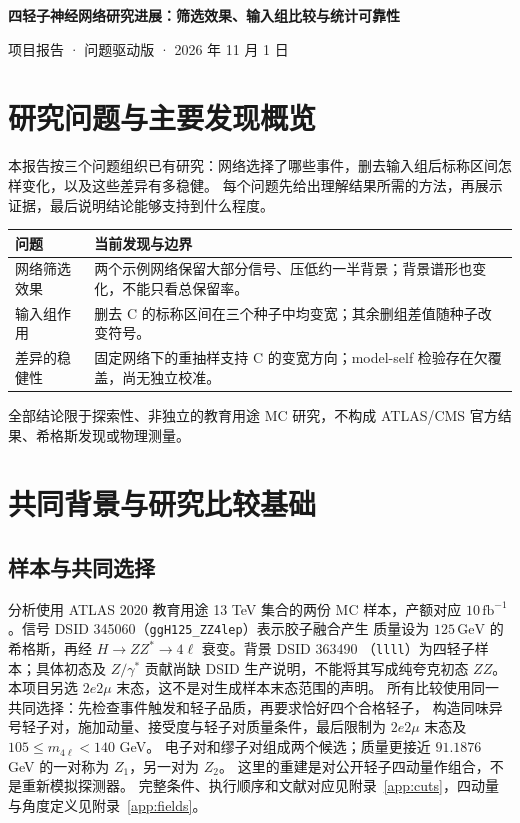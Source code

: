 \documentclass[11pt,a4paper,fontset=fandol,scheme=plain]{ctexart}
\newcommand{\gev}{\,\mathrm{GeV}}
\begin{document}
{\LARGE\bfseries\color{reportblue} 四轻子神经网络研究进展：筛选效果、输入组比较与统计可靠性\par}
\vspace{6pt}
项目报告 · 问题驱动版 · 2026 年 11 月 1 日

\section{研究问题与主要发现概览}

本报告按三个问题组织已有研究：网络选择了哪些事件，删去输入组后标称区间怎样变化，以及这些差异有多稳健。
每个问题先给出理解结果所需的方法，再展示证据，最后说明结论能够支持到什么程度。

\begin{center}
\small
\begin{tabularx}{\linewidth}{@{}p{.23\linewidth}Y@{}}
\toprule
问题 & 当前发现与边界 \\
\midrule
网络筛选效果 & 两个示例网络保留大部分信号、压低约一半背景；背景谱形也变化，不能只看总保留率。 \\
输入组作用 & 删去 C 的标称区间在三个种子中均变宽；其余删组差值随种子改变符号。 \\
差异的稳健性 & 固定网络下的重抽样支持 C 的变宽方向；model-self 检验存在欠覆盖，尚无独立校准。 \\
\bottomrule
\end{tabularx}
\end{center}
全部结论限于探索性、非独立的教育用途 MC 研究，不构成 ATLAS/CMS 官方结果、希格斯发现或物理测量。

\section{共同背景与研究比较基础}

\subsection{样本与共同选择}
分析使用 ATLAS 2020 教育用途 13 TeV 集合的两份 MC 样本\cite{OpenData}，产额对应
$10\,\mathrm{fb}^{-1}$。信号 DSID 345060（\texttt{ggH125\_ZZ4lep}）表示胶子融合产生
质量设为 $125\gev$ 的希格斯，再经 $H\to ZZ^*\to4\ell$ 衰变。背景 DSID 363490
（\texttt{llll}）为四轻子样本；具体初态及 $Z/\gamma^*$ 贡献尚缺 DSID 生产说明，不能将其写成纯夸克初态 $ZZ$。
本项目另选 $2e2\mu$ 末态，这不是对生成样本末态范围的声明。
所有比较使用同一共同选择：先检查事件触发和轻子品质，再要求恰好四个合格轻子，
构造同味异号轻子对，施加动量、接受度与轻子对质量条件，最后限制为
$2e2\mu$ 末态及 $105\leq m_{4\ell}<140$ GeV。
电子对和缪子对组成两个候选；质量更接近 $91.1876$ GeV 的一对称为 $Z_1$，另一对为 $Z_2$。
这里的重建是对公开轻子四动量作组合，不是重新模拟探测器。
完整条件、执行顺序和文献对应见附录~\ref{app:cuts}，四动量与角度定义见附录~\ref{app:fields}。
\end{document}
